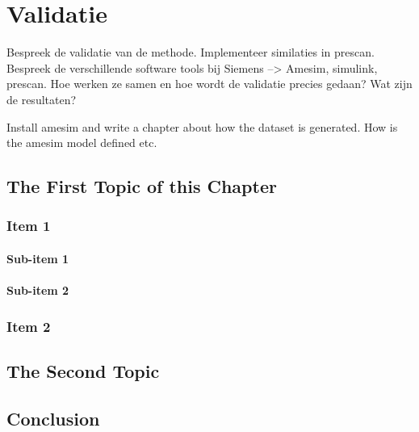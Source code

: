 \chapter{Validatie}
\label{cha:5}

Bespreek de validatie van de methode. Implementeer similaties in prescan.
Bespreek de verschillende software tools bij Siemens --> Amesim, simulink, prescan.
Hoe werken ze samen en hoe wordt de validatie precies gedaan? Wat zijn de resultaten?

Install amesim and write a chapter about how the dataset is generated. How is the amesim model defined etc. 

\section{The First Topic of this Chapter}
\subsection{Item 1}
\subsubsection{Sub-item 1}


\subsubsection{Sub-item 2}


\subsection{Item 2}


\section{The Second Topic}


\section{Conclusion}

